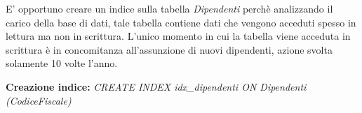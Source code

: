 E' opportuno creare un indice sulla tabella \emph{Dipendenti} perchè analizzando il carico della base di dati, tale tabella contiene dati che vengono acceduti spesso in lettura ma non in scrittura. L'unico momento in cui la tabella viene acceduta in scrittura è in concomitanza all'assunzione di nuovi dipendenti, azione svolta solamente 10 volte l'anno.
\begin{flushleft}
	\textbf{{Creazione indice:}} \emph{CREATE INDEX idx\_dipendenti ON Dipendenti (CodiceFiscale)}
\end{flushleft}

\begin{minipage}{6cm}
\end{minipage}
\hspace{2mm}
\begin{minipage}{6cm}
\end{minipage}